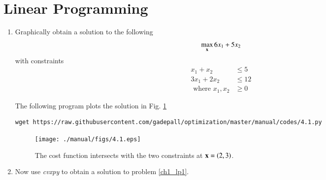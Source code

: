 \documentclass[journal,12pt,twocolumn]{IEEEtran}
\renewcommand\thesection{\arabic{section}}
\begin{document}
\section{Linear Programming}
\begin{enumerate}[label=\thesection.\arabic*,ref=\thesection.\theenumi]
	
	


\item
\label{ch1_lp1}
	Graphically obtain a solution to the following 
	\begin{align}
\max_{\mathbf{x}}	6x_1 + 5x_2
	\end{align}
	with constraints
	\begin{align}
	x_1 + x_2 &\leq 5\\
	3x_1 + 2x_2 &\leq 12\\
	\text{ where } x_1,x_2 &\geq 0
	\end{align}

%
\solution
The following program plots the solution in Fig. \ref{fig.4.1}
%	
\begin{lstlisting}
wget https://raw.githubusercontent.com/gadepall/optimization/master/manual/codes/4.1.py
\end{lstlisting}

%
\begin{figure}[!ht]
\centering
\texttt{[image: ./manual/figs/4.1.eps]}
\caption{ The cost function intersects with the two constraints at $\mathbf{x} = \left(2,3\right)$. }
\label{fig.4.1}	
\end{figure}
%
\item
	Now use {\em cvxpy} to obtain a solution to problem \ref{ch1_lp1}.


\end{enumerate}
\end{document}
